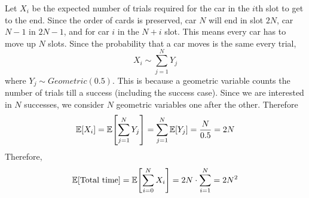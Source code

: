 \documentclass[12pt,titlepage]{extarticle}
\begin{document}
Let $X_i$ be the expected number of trials required for the car in the $i$th slot to get to the end. Since the order of cards is preserved, car $N$ will end in slot $2N$, car $N -1$ in $2N - 1$, and for car $i$ in the $N + i$ slot. This means every car has to move up $N$ slots. Since the probability that a car moves is the same every trial,
\[
	X_i \sim \sum_{j=1}^N Y_j
\]
where $Y_j \sim Geometric(0.5)$. This is because a geometric variable counts the number of trials till a success (including the success case). Since we are interested in $N$ successes, we consider $N$ geometric variables one after the other. Therefore
\[
	\mathbb{E}\qty[X_i] = \mathbb{E}\qty[\sum_{j=1}^N Y_j] = \sum_{j=1}^N \mathbb{E}\qty[Y_j] = \frac{N}{0.5} = 2N
\]
Therefore,
\[
	\mathbb{E}\qty[\text{Total time}] = \mathbb{E}\qty[\sum_{i=0}^N X_i] = 2N \cdot \sum_{i=1}^N = 2N^2
\]
\end{document}

